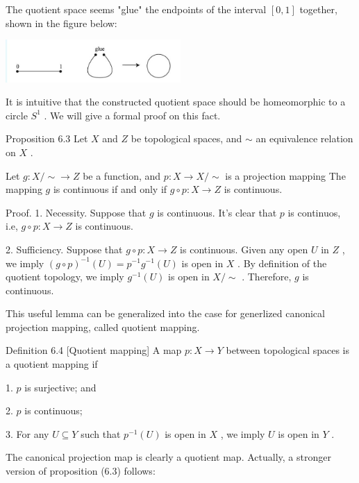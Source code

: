 The quotient space seems "glue" the endpoints of the interval \(\left\lbrack  {0,1}\right\rbrack\) together, shown in the figure below:

\begin{center}
\includegraphics[max width=0.5\textwidth]{images/bo_d2bcsrref24c73avs720_67_642_1709_669_163_0.jpg}
\end{center}
\hspace*{3em} 

It is intuitive that the constructed quotient space should be homeomorphic to a circle \({S}^{1}\) . We will give a formal proof on this fact.

Proposition 6.3 Let \(X\) and \(Z\) be topological spaces, and \(\sim\) an equivalence relation on \(X\) .

Let \(g : X/ \sim   \rightarrow  Z\) be a function, and \(p : X \rightarrow  X/ \sim\) is a projection mapping The mapping \(g\) is continuous if and only if \(g \circ  p : X \rightarrow  Z\) is continuous.

Proof. 1. Necessity. Suppose that \(g\) is continuous. It’s clear that \(p\) is continuos, i.e, \(g \circ  p : X \rightarrow  Z\) is continuous.

2. Sufficiency. Suppose that \(g \circ  p : X \rightarrow  Z\) is continuous. Given any open \(U\) in \(Z\) , we imply \({\left( g \circ  p\right) }^{-1}\left( U\right)  = {p}^{-1}{g}^{-1}\left( U\right)\) is open in \(X\) . By definition of the quotient topology, we imply \({g}^{-1}\left( U\right)\) is open in \(X/ \sim\) . Therefore, \(g\) is continuous.

This useful lemma can be generalized into the case for generlized canonical projection mapping, called quotient mapping.

Definition 6.4 [Quotient mapping] A map \(p : X \rightarrow  Y\) between topological spaces is a quotient mapping if

1. \(p\) is surjective; and

2. \(p\) is continuous;

3. For any \(U \subseteq  Y\) such that \({p}^{-1}\left( U\right)\) is open in \(X\) , we imply \(U\) is open in \(Y\) .

The canonical projection map is clearly a quotient map. Actually, a stronger version of proposition (6.3) follows:


